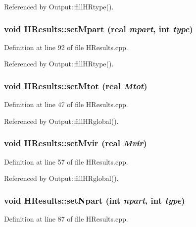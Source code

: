 Referenced by Output::fillHRtype().

\subsubsection[{setMpart}]{\setlength{\rightskip}{0pt plus 5cm}void HResults::setMpart ({\bf real} {\em mpart}, \/  int {\em type})}\label{classHResults_a98894da316321425e9eb8d064b5ab9bf}


Definition at line 92 of file HResults.cpp.



Referenced by Output::fillHRtype().

\subsubsection[{setMtot}]{\setlength{\rightskip}{0pt plus 5cm}void HResults::setMtot ({\bf real} {\em Mtot})}\label{classHResults_a7d3c50c2af764f928f8891c9685ba495}


Definition at line 47 of file HResults.cpp.



Referenced by Output::fillHRglobal().

\subsubsection[{setMvir}]{\setlength{\rightskip}{0pt plus 5cm}void HResults::setMvir ({\bf real} {\em Mvir})}\label{classHResults_a0495a311c2af6707ab8a74b7a8adaff7}


Definition at line 57 of file HResults.cpp.



Referenced by Output::fillHRglobal().

\subsubsection[{setNpart}]{\setlength{\rightskip}{0pt plus 5cm}void HResults::setNpart (int {\em npart}, \/  int {\em type})}\label{classHResults_aa7e6a6e1f0f8bcdea511540448e63fb6}


Definition at line 87 of file HResults.cpp.



